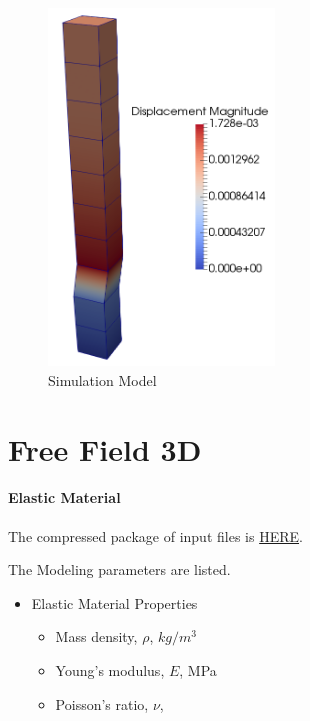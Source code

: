 \begin{figure}[H]
  \centering
  \includegraphics[width = 6cm]{./Figure-files/nonlinear_analysis_steps/free_field_1D/DRM1D_Motion3D.png}
  \caption{Simulation Model}
  \label{fig_decon_3D_motion_1D_model_results}
\end{figure}



\clearpage
\newpage
\section{Free Field 3D}
\label{free_field_3D}

\paragraph{Elastic Material}
The compressed package of input files is  
\href{https://github.com/yuan-energy/Real-ESSI-Short-Course-Examples/tree/master/short-course-examples/nonlinear_analysis_steps/free_field_3D/elastic/elastic.tgz?raw=true}{HERE}. 


The Modeling parameters are listed.
\begin{itemize}
  \item Elastic Material Properties 
  \begin{itemize}
    \item Mass density, $\rho$, \enspace {} $kg/m^3$
    \item Young's modulus, $E$, \enspace {} MPa
    \item Poisson's ratio, $\nu$, \enspace {}
  \end{itemize}
\end{itemize}


